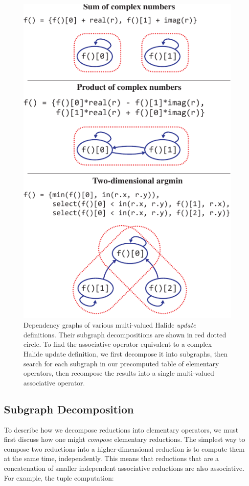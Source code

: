 \begin{figure}[tb]
\centering
\includegraphics{subgraphs}
\caption{Dependency graphs of various multi-valued Halide \emph{update} definitions. Their subgraph decompositions are shown in red dotted circle. To find the associative operator equivalent to a complex Halide update definition, we first decompose it into subgraphs, then search for each subgraph in our precomputed table of elementary operators, then recompose the results into a single multi-valued associative operator.}
\label{fig:subgraphs}
\end{figure}

\subsection{Subgraph Decomposition}
\label{subsec:decomposition}

To describe how we decompose reductions into elementary operators, we must first discuss how one might \emph{compose} elementary reductions. The simplest way to compose two reductions into a higher-dimensional reduction is to compute them at the same time, independently. This means that reductions that are a concatenation of smaller independent associative reductions are also associative. For example, the tuple computation:

